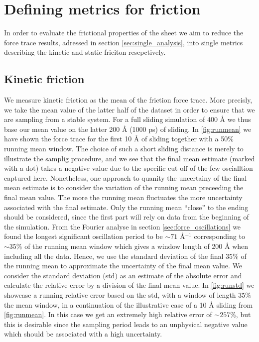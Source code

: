 \section{Defining metrics for friction}\label{sec:fric_metrics}

In order to evaluate the frictional properties of the sheet we aim to reduce the force trace results, adressed in section \cref{sec:single_analysis}, into single metrics describing the kinetic and static friciton resepctively. 

\subsection{Kinetic friction}
We measure kinetic friction as the mean of the friction force trace. More
precisly, we take the mean value of the latter half of the dataset in order to
ensure that we are sampling from a stable system. For a full sliding simulation
of 400 Å we thus base our mean value on the latter 200 Å (1000 ps) of sliding.
In \cref{fig:runmean} we have shown the force trace for the first 10 Å of
sliding together with a 50\% running mean window. The choice of such a short sliding distance is merely to illustrate the samplig procedure,
and we see that the final mean estimate (marked
with a dot) takes a negative value due to the specific cut-off of the few
oscialltion captured here. Nonetheless, one approach to quanity the uncertainy
of the final mean estimate is to consider the variation of the running mean
preceeding the final mean value. The more the running mean fluctuates the more
uncertainty associated with the final estimate. Only the running mean
``close'' to the ending should be considered, since the first part will rely on
data from the beginning of the simulation. From the Fourier analyse in section
\cref{sec:force_oscillations} we found the longest significant oscillation
period to be $\sim 71$ Å$^{-1}$ corresponding to $\sim 35 \%$ of the running
mean window which gives a window length of 200 Å when including all the data.
Hence, we use the standard deviation of the final 35\% of the running mean to
approximate the uncertainty of the final mean value. We consider the standard
deviation (\acrshort{std}) as an estimate of the absolute error and calculate the relative error
by a division of the final mean value. In \cref{fig:runstd} we showcase a
running relative error based on the \acrshort{std}, with a window of length
$35 \%$ the mean window, in a continuation of the illustrative case of a 10 Å
sliding from \cref{fig:runmean}. In this case we get an extremely high relative error of $\sim 257\%$, but this is desirable since the sampling period leads to an unphysical negative value which should be associated with a high uncertainty. 

